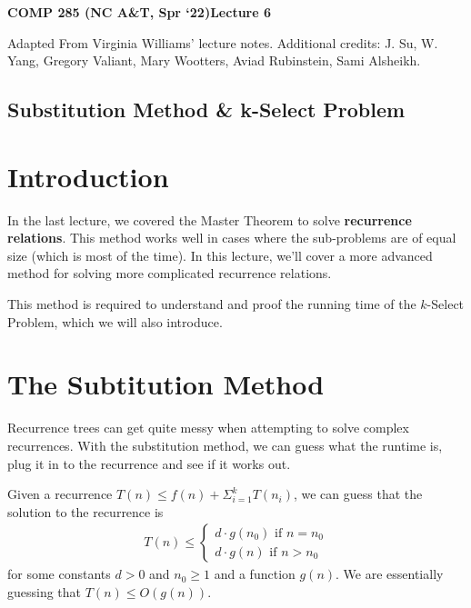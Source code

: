 \documentclass [12pt]{article}
\begin{document}
 

{\LARGE \textbf {COMP 285 (NC A\&T, Spr `22)}\hfill \textbf {Lecture 6} } 
\vspace {1em} 
\begin {Instruction} 

Adapted From Virginia Williams' lecture notes. Additional credits: J. Su, W. Yang, Gregory Valiant, Mary Wootters, Aviad Rubinstein, Sami Alsheikh.
\end {Instruction} 

\begin{centering}
\section*{Substitution Method \& k-Select Problem}
\end{centering}

\section{Introduction}
In the last lecture, we covered the Master Theorem to solve \textbf{recurrence relations}. This method works well in cases where the sub-problems are of equal size (which is most of the time). In this lecture, we'll cover a more advanced method for solving more complicated recurrence relations. 

This method is required to understand and proof the running time of the $k$-Select Problem, which we will also introduce.

\section{The Subtitution Method}
Recurrence trees can get quite messy when attempting to solve complex recurrences. With the substitution method, we can guess what the runtime is, plug it in to the recurrence and see if it works out.

Given a recurrence $T(n) \leq f (n) + \Sigma^{k}_{i=1}T(n_i)$, we can guess that the solution to the recurrence is
\begin{align*}
    T(n) \leq \begin{cases}
        d \cdot g(n_0) \text{ if } n = n_0 \\
        d \cdot g(n) \text{ if } n > n_0
    \end{cases}
\end{align*}
for some constants $d > 0$ and $n_0 \geq 1$ and a function $g(n)$. We are essentially guessing that $T(n) \leq O(g(n))$.
\end{document}
